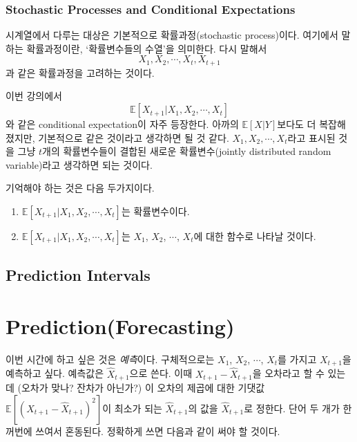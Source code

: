 \documentclass{article}
\begin{document}
%
\subsubsection{Stochastic Processes and Conditional Expectations}
시계열에서 다루는 대상은 기본적으로 확률과정(stochastic process)이다.
여기에서 말하는 확률과정이란, `확률변수들의 수열'을 의미한다.
다시 말해서
\[X_1,X_2,\cdots,X_t,X_{t+1}\]
과 같은 확률과정을 고려하는 것이다.

이번 강의에서
\[\mathbb E[X_{t+1}|X_1,X_2,\cdots,X_t]\]
와 같은 conditional expectation이 자주 등장한다.
아까의 \(\mathbb E[X|Y]\)보다도 더 복잡해졌지만, 기본적으로 같은 것이라고 생각하면 될 것 같다.
\(X_1,X_2,\cdots,X_t\)라고 표시된 것을 그냥 \(t\)개의 확률변수들이 결합된 새로운 확률변수(jointly distributed random variable)라고 생각하면 되는 것이다.

기억해야 하는 것은 다음 두가지이다.
\begin{enumerate}[label=(\arabic*)]
\item
\(\mathbb E[X_{t+1}|X_1,X_2,\cdots,X_t]\)는 확률변수이다.
\item
\(\mathbb E[X_{t+1}|X_1,X_2,\cdots,X_t]\)는 \(X_1\), \(X_2\), \(\cdots\), \(X_t\)에 대한 함수로 나타날 것이다.
\end{enumerate}

\subsection{Prediction Intervals}

\section{Prediction(Forecasting)}

이번 시간에 하고 싶은 것은 \emph{예측}이다.
구체적으로는 \(X_1\), \(X_2\), \(\cdots\), \(X_t\)를 가지고 \(X_{t+1}\)을 예측하고 싶다.
예측값은 \(\hat X_{t+1}\)으로 쓴다.
이때 \(X_{t+1}-\hat X_{t+1}\)을 오차라고 할 수 있는데 (오차가 맞나? 잔차가 아닌가?)
이 오차의 제곱에 대한 기댓값 \(\mathbb E[(X_{t+1}-\hat X_{t+1})^2]\)이 최소가 되는 \(\hat X_{t+1}\)의 값을 \(\hat X_{t+1}\)로 정한다.
단어 두 개가 한꺼번에 쓰여서 혼동된다.
정확하게 쓰면 다음과 같이 써야 할 것이다.
\end{document}
